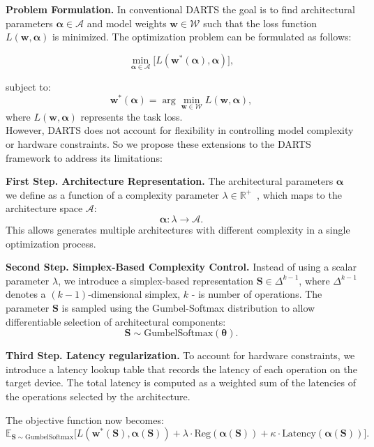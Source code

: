 \documentclass{article}
\begin{document}
\textbf{Problem Formulation.} In conventional DARTS the goal is to find architectural parameters \(\boldsymbol{\alpha} \in \mathcal{A}\) and model weights \(\boldsymbol{w} \in \mathcal{W}\) such that the loss function \(L(\boldsymbol{w}, \boldsymbol{\alpha})\) is minimized. The optimization problem can be formulated as follows:

\[
\min_{\boldsymbol{\alpha} \in \mathcal{A}} \big[L(\boldsymbol{w}^*(\boldsymbol{\alpha}), \boldsymbol{\alpha}) \big],
\]

subject to:
\[
\boldsymbol{w}^*(\boldsymbol{\alpha}) = \arg \min_{\boldsymbol{w} \in \mathcal{W}} L(\boldsymbol{w}, \boldsymbol{\alpha}),
\]
where \(L(\boldsymbol{w}, \boldsymbol{\alpha})\) represents the task loss.  \\
However, DARTS does not account for flexibility in controlling model complexity or hardware constraints. So we propose these extensions to the DARTS framework to address its limitations:

\textbf{First Step. Architecture Representation.} The architectural parameters \(\boldsymbol{\alpha}\) we define as a function of a complexity parameter \(\lambda \in \mathbb{R}^+\)~\cite{yakovlev2021neural}, which maps to the architecture space \(\mathcal{A}\):
\[
\boldsymbol{\alpha}: \lambda \to \mathcal{A}.
\]
This allows generates multiple architectures with different complexity in a single optimization process.

\textbf{Second Step. Simplex-Based Complexity Control.} Instead of using a scalar parameter \(\lambda\), we introduce a simplex-based representation \( \boldsymbol{S} \in \Delta^{k-1}\), where \(\Delta^{k-1}\) denotes a \((k-1)\)-dimensional simplex,  \(k\) - is number of operations. The parameter \(\boldsymbol{S}\) is sampled using the Gumbel-Softmax distribution to allow differentiable selection of architectural components:
\[
\boldsymbol{S} \sim \text{GumbelSoftmax}(\boldsymbol{\theta}).
\]

\textbf{Third Step. Latency regularization.} To account for hardware constraints, we introduce a latency lookup table that records the latency of each operation on the target device. The total latency is computed as a weighted sum of the latencies of the operations selected by the architecture.

The objective function now becomes:
\[
\mathbb{E}_{\boldsymbol{S} \sim \text{GumbelSoftmax}} \big[L(\boldsymbol{w}^*(\boldsymbol{S}), \boldsymbol{\alpha}(\boldsymbol{S})) + \lambda \cdot \text{Reg}(\boldsymbol{\alpha}(\boldsymbol{S})) + \kappa \cdot \text{Latency}(\boldsymbol{\alpha}(\boldsymbol{S}))\big].
\]
\end{document}
